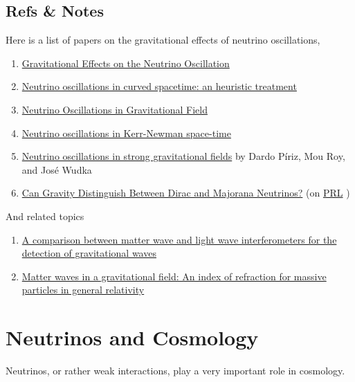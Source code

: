 \documentclass[letterpaper,12pt,english]{sphinxmanual}
\begin{document}
\section{Refs \& Notes}
\label{gravity:refs-notes}
Here is a list of papers on the gravitational effects of neutrino oscillations,
\begin{enumerate}
\item {} 
\href{http://arxiv.org/abs/hep-ph/9611231}{Gravitational Effects on the Neutrino Oscillation}

\item {} 
\href{http://arxiv.org/abs/hep-ph/9610494}{Neutrino oscillations in curved spacetime: an heuristic treatment}

\item {} 
\href{http://arxiv.org/abs/0906.5556}{Neutrino Oscillations in Gravitational Field}

\item {} 
\href{http://arxiv.org/abs/1002.0648}{Neutrino oscillations in Kerr-Newman space-time}

\item {} 
\href{http://journals.aps.org/prd/abstract/10.1103/PhysRevD.54.1587}{Neutrino oscillations in strong gravitational fields} by Dardo Píriz, Mou Roy, and José Wudka

\item {} 
\href{http://arxiv.org/abs/gr-qc/0605153}{Can Gravity Distinguish Between Dirac and Majorana Neutrinos?} (on \href{http://journals.aps.org/prl/abstract/10.1103/PhysRevLett.97.041101}{PRL} )

\end{enumerate}

And related topics
\begin{enumerate}
\item {} 
\href{http://arxiv.org/abs/gr-qc/0609075}{A comparison between matter wave and light wave interferometers for the detection of gravitational waves}

\item {} 
\href{http://arxiv.org/abs/gr-qc/0107063}{Matter waves in a gravitational field: An index of refraction for massive particles in general relativity}

\end{enumerate}


\chapter{Neutrinos and Cosmology}
\label{cosmology:neutrinos-and-cosmology}\label{cosmology::doc}
Neutrinos, or rather weak interactions, play a very important role in cosmology.
\end{document}
